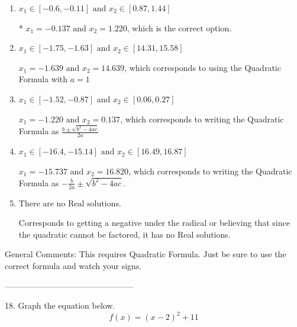 \documentclass{article}[14pt]
\begin{document}
\begin{enumerate}[label=\Alph*.] 
\item $ x_1 \in [-0.6, -0.11] \text{ and } x_2 \in [0.87, 1.44] $ 

 * $x_1 = -0.137 \text{ and } x_2 = 1.220$, which is the correct option. 
\item $ x_1 \in [-1.75, -1.63] \text{ and } x_2 \in [14.31, 15.58] $ 

  $x_1 = -1.639 \text{ and } x_2 = 14.639$, which corresponds to using the Quadratic Formula with $a=1$ 
\item $ x_1 \in [-1.52, -0.87] \text{ and } x_2 \in [0.06, 0.27] $ 

  $x_1 = -1.220 \text{ and } x_2 = 0.137$, which corresponds to writing the Quadratic Formula as $\frac{b \pm \sqrt{b^2 - 4ac}}{2a}$ 
\item $ x_1 \in [-16.4, -15.14] \text{ and } x_2 \in [16.49, 16.87] $ 

  $x_1 = -15.737 \text{ and } x_2 = 16.820$, which corresponds to writing the Quadratic Formula as $-\frac{b}{2a} \pm \sqrt{b^2 - 4ac}$. 
\item $ \text{There are no Real solutions.} $ 

 Corresponds to getting a negative under the radical or believing that since the quadratic cannot be factored, it has no Real solutions. 
\end{enumerate} 
 
General Comments: This requires Quadratic Formula. Just be sure to use the correct formula and watch your signs.

-----------------------------------------------

18. Graph the equation below.
$$ f(x) = (x-2)^2 + 11 $$ 
\end{document}
